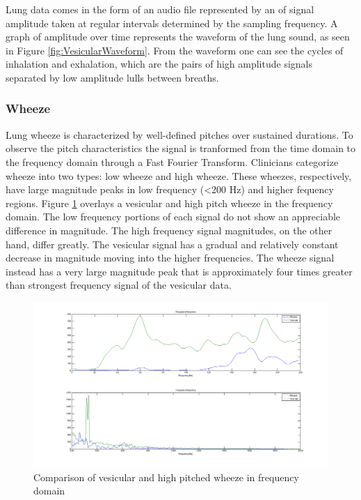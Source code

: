 \documentclass{article}
\begin{document}
Lung data comes in the form of an audio file represented by an of signal amplitude taken at regular intervals determined by the sampling frequency. A graph of amplitude over time represents the waveform of the lung sound, as seen in Figure \ref{fig:VesicularWaveform}. From the waveform one can see the cycles of inhalation and exhalation, which are the pairs of high amplitude signals separated by low amplitude lulls between breaths. \\

\subsubsection{Wheeze}

Lung wheeze is characterized by well-defined pitches over sustained durations. To observe the pitch characteristics the signal is tranformed from the time domain to the frequency domain through a Fast Fourier Transform. Clinicians categorize wheeze into two types: low wheeze and high wheeze. These wheezes, respectively, have large magnitude peaks in low frequency (<200 Hz) and higher fequency regions. Figure \ref{fig:FFTVesicularWheeze} overlays a vesicular and high pitch wheeze in the frequency domain. The low frequency portions of each signal do not show an appreciable difference in magnitude. The high frequency signal magnitudes, on the other hand, differ greatly. The vesicular signal has a gradual and relatively constant decrease in magnitude moving into the higher frequencies. The wheeze signal instead has a very large magnitude peak that is approximately four times greater than strongest frequency signal of the vesicular data. \\

\begin{figure}[H]
	\includegraphics[width=\linewidth]{images/FFTVesicularWheeze.png}
	\caption{Comparison of vesicular and high pitched wheeze in frequency domain}
 	\label{fig:FFTVesicularWheeze}
\end{figure}
\end{document}
